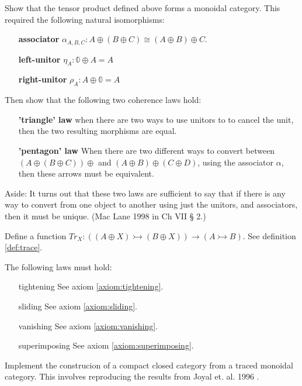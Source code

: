 \begin{objective} \label{obj:monoidal}
  Show that the tensor product defined above forms a monoidal
  category. This required the following natural isomorphisms:
  \begin{itemize}
  \item[\textbf{associator}] $\alpha_{A,B,C} : A \oplus (B \oplus C) \cong (A \oplus B) \oplus C$.
  \item[\textbf{left-unitor}] $\eta_{A} : 𝟘 \oplus A = A$
  \item[\textbf{right-unitor}] $\rho_{A} : A \oplus 𝟘 = A$
  \end{itemize}
  Then show that the following two coherence laws hold: \\  
  \begin{itemize}
  \item[\textbf{'triangle' law}] when there are two ways to use
    unitors to to cancel the unit, then the two resulting morphisms
    are equal.
  \item[\textbf{'pentagon' law}] When there are two different ways to
    convert between $(A \oplus (B \oplus C)) \oplus$ and
    $(A \oplus B) \oplus (C \oplus D)$, using the associator $\alpha$,
    then these arrows must be equivalent.
  \end{itemize}
Aside: It turns out that these two laws are sufficient to say that if there
is any way to convert from one object to another using just the
unitors, and associators, then it must be unique. (Mac
Lane 1998 \cite{maclane1998-categories-book} in Ch VII § 2.)
\end{objective}
\begin{objective}
  Define a function $Tr_X : ((A \oplus X) ↣ (B \oplus X)) \to (A ↣ B)$. See definition \ref{def:trace}.
\end{objective}
\begin{objective}
  \label{obj:trace-coherence}
  The following laws must hold:
  \begin{itemize}
    \item[tightening] See axiom \ref{axiom:tightening}.
    \item[sliding] See axiom \ref{axiom:sliding}.
    \item[vanishing] See axiom \ref{axiom:vanishing}.
    \item[superimposing] See axiom \ref{axiom:superimposing}.
  \end{itemize}
\end{objective}
\begin{objective}
  \label{obj:int-construction}
  Implement the construcion of a compact closed
  category\cite{day1977-note-compact-closed} from a traced monoidal
  category. This involves reproducing the results from Joyal
  et. al. 1996 \cite{joyal1996-traced-monoidal-categories}.
\end{objective}

